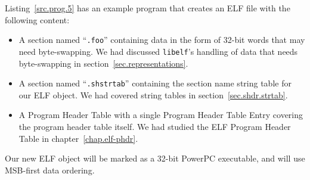\documentclass[a4paper,pdftex]{book}
\newcommand{\library}[1]{\texttt{#1}}
\newcommand{\parameter}[1]{\texttt{#1}}
\newcommand{\trade}{\texttrademark\xspace}
\newcommand{\elfdatastructure}[1]{\textsf{#1}}
\begin{document}
Listing~\vref{src.prog.5} has an example program that creates an ELF
file with the following content:

\begin{itemize}
\item A section named ``\parameter{.foo}'' containing data in the form
  of 32-bit words that may need byte-swapping. We had discussed
  \library{libelf}'s handling of data that needs byte-swapping in
  section~\vref{sec.representations}.
\item A section named ``\parameter{.shstrtab}'' containing the section
  name string table for our ELF object. We had covered string tables
  in section~\vref{sec.shdr.strtab}.
\item A \elfdatastructure{Program Header Table} with a single
  \elfdatastructure{Program Header Table Entry} covering the program
  header table itself. We had studied the ELF
  \elfdatastructure{Program Header Table} in
  chapter~\ref{chap.elf-phdr}.
\end{itemize}

Our new ELF object will be marked as a 32-bit PowerPC\trade
executable, and will use MSB-first data ordering.
\end{document}

